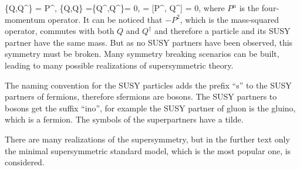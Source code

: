 {
\{Q,Q^{\dagger}\} = P^{\mu}, \; \{Q,Q\} =\{Q^{\dagger},Q^{\dagger}\}= 0, \; [P^{\mu}, Q] = [P^{\mu}, Q^{\dagger}] = 0,
}
where $P^{\mu}$ is the four-momentum operator. It can be noticed that $-P^{2}$, which is the mass-squared operator, commutes with both $Q$ and $Q^{\dagger}$ and therefore a particle and its SUSY partner have the same mass. But as no SUSY partners have been observed, this symmetry must be broken. Many symmetry breaking scenarios can be built, leading to many possible realizations of supersymmetric theory. 

The naming convention for the SUSY particles adds the prefix ``s'' to the SUSY partners of fermions, therefore sfermions are bosons. The SUSY partners to bosons get the suffix ``ino'', for example the SUSY partner of gluon is the gluino, which is a fermion. The symbols of the superpartners have a tilde.

There are many realizations of the supersymmetry, but in the further text only the minimal supersymmetric standard model, which is the most popular one, is considered.



